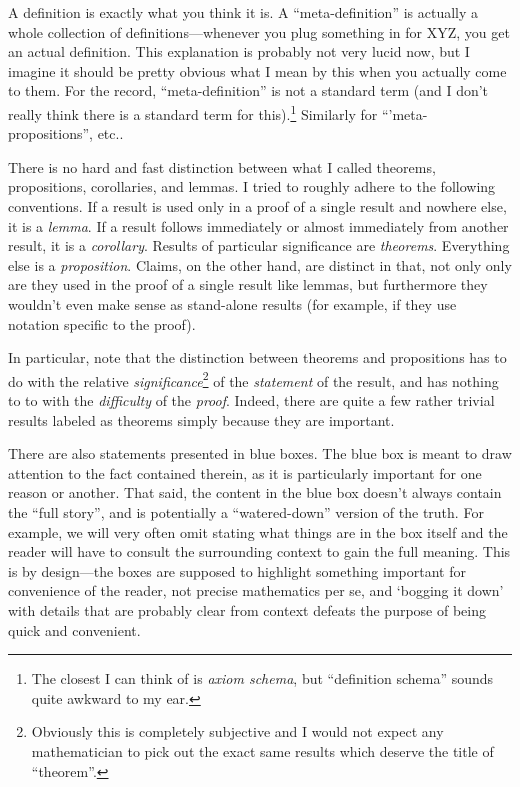 A definition is exactly what you think it is.  A ``meta-definition'' is actually a whole collection of definitions---whenever you plug something in for XYZ, you get an actual definition.  This explanation is probably not very lucid now, but I imagine it should be pretty obvious what I mean by this when you actually come to them.  For the record, ``meta-definition'' is not a standard term (and I don't really think there is a standard term for this).\footnote{The closest I can think of is \emph{axiom schema}, but ``definition schema'' sounds quite awkward to my ear.}  Similarly for ``'meta-propositions'', etc..

There is no hard and fast distinction between what I called theorems, propositions, corollaries, and lemmas.  I tried to roughly adhere to the following conventions.  If a result is used only in a proof of a single result and nowhere else, it is a \emph{lemma}.  If a result follows immediately or almost immediately from another result, it is a \emph{corollary}.  Results of particular significance are \emph{theorems}.  Everything else is a \emph{proposition}.  Claims, on the other hand, are distinct in that, not only only are they used in the proof of a single result like lemmas, but furthermore they wouldn't even make sense as stand-alone results (for example, if they use notation specific to the proof).

In particular, note that the distinction between theorems and propositions has to do with the relative \emph{significance}\footnote{Obviously this is completely subjective and I would not expect any mathematician to pick out the exact same results which deserve the title of ``theorem''.} of the \emph{statement} of the result, and has nothing to to with the \emph{difficulty} of the \emph{proof}.  Indeed, there are quite a few rather trivial results labeled as theorems simply because they are important.

There are also statements presented in blue boxes.  The blue box is meant to draw attention to the fact contained therein, as it is particularly important for one reason or another.  That said, the content in the blue box doesn't always contain the ``full story'', and is potentially a ``watered-down'' version of the truth.  For example, we will very often omit stating what things are in the box itself and the reader will have to consult the surrounding context to gain the full meaning.  This is by design---the boxes are supposed to highlight something important for convenience of the reader, not precise mathematics per se, and `bogging it down' with details that are probably clear from context defeats the purpose of being quick and convenient.

